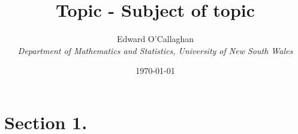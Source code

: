 \documentclass[10pt,a4paper]{article}
\title{\textbf{Topic - Subject of topic}\\}
\author{Edward O'Callaghan\\
\textit{Department of Mathematics and Statistics, University of New South Wales}}
\date{\today}
\begin{document}
\maketitle

\section{Section 1.}



\end{document}
